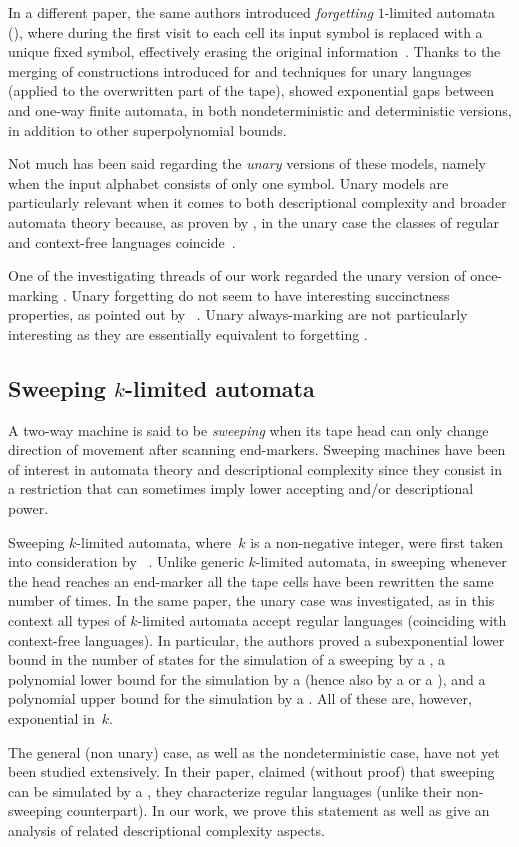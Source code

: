 In a different paper, the same authors introduced \emph{forgetting} $1$-limited automata (\FOLA), where during the first visit to each cell its input symbol is replaced with a unique fixed symbol, effectively erasing the original information~\cite{PigPri23,JanMra+93}.
Thanks to the merging of constructions introduced for \AMOLA and techniques for unary languages (applied to the overwritten part of the tape), \citeauthor{PigPri23} showed exponential gaps between \AMOLA and one-way finite automata, in both nondeterministic and deterministic versions, in addition to other superpolynomial bounds.

Not much has been said regarding the \emph{unary} versions of these models, namely when the input alphabet consists of only one symbol.
Unary models are particularly relevant when it comes to both descriptional complexity and broader automata theory because, as proven by \citeauthor{GinRic62}, in the unary case the classes of regular and context-free languages coincide~\cite{GinRic62}.

One of the investigating threads of our work regarded the unary version of once-marking \OLAs.
Unary forgetting \OLAs do not seem to have interesting succinctness properties, as pointed out by \citeauthor{PigPri23}~\cite{PigPri23}.
Unary always-marking \OLAs are not particularly interesting as they are essentially equivalent to forgetting \OLA.


\subsection{Sweeping \texorpdfstring{$k$}{k}-limited automata}
A two-way machine is said to be \emph{sweeping} when its tape head can only change direction of movement after scanning end-markers.
Sweeping machines have been of interest in automata theory and descriptional complexity since they consist in a restriction that can sometimes imply lower accepting and/or descriptional power.

Sweeping $k$-limited automata, where~$k$ is a non-negative integer, were first taken into consideration by \citeauthor{KutPig+18}~\cite{KutPig+18}.
Unlike generic $k$-limited automata, in sweeping \kLA whenever the head reaches an end-marker all the tape cells have been rewritten the same number of times.
In the same paper, the unary case was investigated, as in this context all types of $k$-limited automata accept regular languages (coinciding with context-free languages).
In particular, the authors proved a subexponential lower bound in the number of states for the simulation of a sweeping \kDLA by a \ODFA, a polynomial lower bound for the simulation by a \TNFA (hence also by a \TDFA or a \ONFA), and a polynomial upper bound for the simulation by a \TDFA.
All of these are, however, exponential in~$k$.

The general (non unary) case, as well as the nondeterministic case, have not yet been studied extensively.
In their paper, \citeauthor{KutPig+18} claimed (without proof) that sweeping \kLAs can be simulated by a \ONFA, \ie they characterize regular languages (unlike their non-sweeping counterpart).
In our work, we prove this statement as well as give an analysis of related descriptional complexity aspects.
